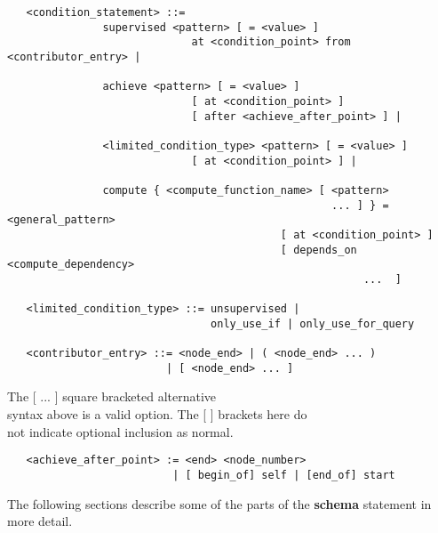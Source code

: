 \begin{verbatim}
   <condition_statement> ::=
               supervised <pattern> [ = <value> ]
                             at <condition_point> from <contributor_entry> |

               achieve <pattern> [ = <value> ]
                             [ at <condition_point> ]
                             [ after <achieve_after_point> ] |

               <limited_condition_type> <pattern> [ = <value> ]
                             [ at <condition_point> ] |

               compute { <compute_function_name> [ <pattern>
                                                   ... ] } = <general_pattern>
                                           [ at <condition_point> ]
                                           [ depends_on <compute_dependency>
                                                        ...  ]

   <limited_condition_type> ::= unsupervised | 
                                only_use_if | only_use_for_query

   <contributor_entry> ::= <node_end> | ( <node_end> ... ) 
                         | [ <node_end> ... ]
\end{verbatim}

\begin{flushright}
The [  ... ] square bracketed alternative \\
syntax above is a valid option. The [ ] brackets here do \\
not indicate optional inclusion as normal.
\end{flushright}

\begin{verbatim}
   <achieve_after_point> := <end> <node_number> 
                          | [ begin_of] self | [end_of] start
\end{verbatim}


The following sections describe some of the parts of the {\bf
schema} statement in more detail. 

